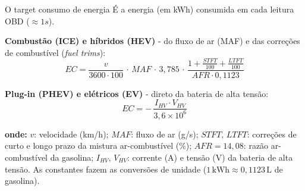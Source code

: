 \documentclass[aspectratio=169,11pt]{beamer}
\begin{document}
\begin{frame}{O target consumo de energia}
  É a energia (em kWh) consumida em cada leitura OBD ($\approx 1s$).
  \smallskip

  \textbf{Combustão (ICE) e híbridos (HEV)} - do fluxo de ar (MAF) e das correções
  de combustível (\emph{fuel trims}):
  \[
    EC = \frac{v}{3600 \cdot 100}\, \cdot\, MAF \,\cdot\, 3{,}785 \,\cdot\,
         \frac{1 + \frac{STFT}{100} + \frac{LTFT}{100}}{AFR \cdot 0{,}1123}
  \]

  \textbf{Plug-in (PHEV) e elétricos (EV)} - direto da bateria de alta tensão:
  \[
    EC = -\,\frac{I_{HV} \cdot V_{HV}}{3{,}6 \times 10^{6}}
  \]

  \smallskip
  {\footnotesize
  \textbf{onde:}\;
  $v$: velocidade (km/h);\quad
  $MAF$: fluxo de ar (g/s);\quad
  $STFT,\,LTFT$: correções de curto e longo prazo da mistura ar-combustível (\%);\quad
  $AFR = 14{,}08$: razão ar-combustível da gasolina;\quad
  $I_{HV},\,V_{HV}$: corrente (A) e tensão (V) da bateria de alta tensão.
  As constantes fazem as conversões de unidade ($1\,\text{kWh} \approx 0{,}1123\,\text{L}$ de gasolina).}
\end{frame}
\end{document}
